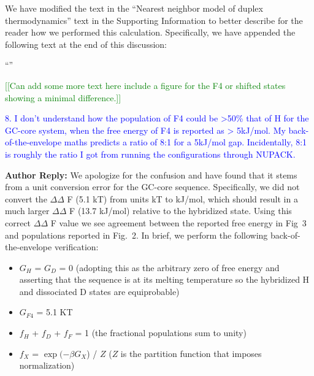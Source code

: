 \documentclass[11pt,a4paper]{letter} %
\newcommand*{\rood}[1]{{\color{red}{#1}}}
\newcommand*{\noteg}[1]{\textcolor{green}{[[#1]]}}		%
\begin{document}
We have modified the text in the ``Nearest neighbor model of duplex thermodynamics'' text in the Supporting Information to better describe for the reader how we performed this calculation. Specifically, we have appended the following text at the end of this discussion:

``\rood{In applying the NN models to each macrostate, we made the simplifying assumption that the ensemble of microstates constituting each macrostate could be represented by a single pattern of Watson-Crick base pairing that are schematically illustrated in Fig.~2a. Indeed, each macrostate is composed of an ensemble of partially frayed states with higher free energy contributions than the intact pattern. However, when averaging across the frayed contributions of all microstates in each macrostate, we have found that incorporating additional NN configurations changes 
$\Delta\Delta$ F values by $<$ 1 kJ/mol when compared to using a single microstate. Given the extent to which a single NN representation captures each macrostate (which is further demonstrated in Fig.~S7), we have elected to maintain a single microstate free energy estimate for each macrostate}''

\noteg{Can add some more text here include a figure for the F4 or shifted states showing a minimal difference.}


\textcolor{blue}{8. I don't understand how the population of F4 could be >50\% that of H for the GC-core system, when the free energy of F4 is reported as > 5kJ/mol. My back-of-the-envelope maths predicts a ratio of 8:1 for a 5kJ/mol gap. Incidentally, 8:1 is roughly the ratio I got from running the configurations through NUPACK.}

\textbf{Author Reply:}  We apologize for the confusion and have found that it stems from a unit conversion error for the GC-core sequence. Specifically, we did not convert the $\Delta\Delta$ F (5.1 kT) from units kT to kJ/mol, which should result in a much larger $\Delta\Delta$ F (13.7 kJ/mol) relative to the hybridized state. 
Using this correct $\Delta\Delta$ F value we see agreement between the reported free energy in Fig~3 and populations reported in Fig.~2. In brief, we perform the following back-of-the-envelope verification:

\begin{itemize}
\item $G_H$ = $G_D$ = 0 (adopting this as the arbitrary zero of free energy and asserting that the sequence is at its melting temperature so the hybridized H and dissociated D states are equiprobable)
\item $G_{F4}$ = 5.1 KT
\item $f_H$ + $f_D$ + $f_F$ = 1 (the fractional populations sum to unity)
\item $f_X$ = $\exp (-\beta G_X$) / $Z$ ($Z$ is the partition function that imposes normalization)
\end{itemize}
\end{document}
